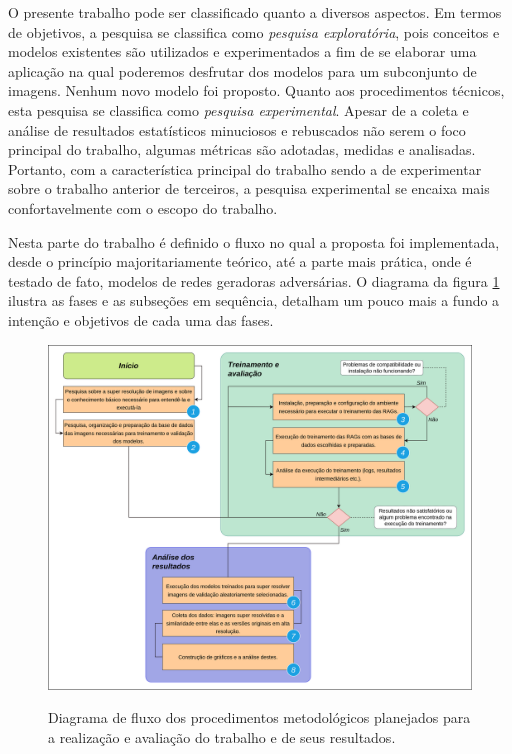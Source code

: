 \label{procedimentos}

O presente trabalho pode ser classificado quanto a diversos aspectos. Em termos de objetivos, a pesquisa se classifica como \textit{pesquisa exploratória}, pois conceitos e modelos existentes são utilizados e experimentados a fim de se elaborar uma aplicação na qual poderemos desfrutar dos modelos para um subconjunto de imagens. Nenhum novo modelo foi proposto. Quanto aos procedimentos técnicos, esta pesquisa se classifica como \textit{pesquisa experimental}. Apesar de a coleta e análise de resultados estatísticos minuciosos e rebuscados não serem o foco principal do trabalho, algumas métricas são adotadas, medidas e analisadas. Portanto, com a característica principal do trabalho sendo a de experimentar sobre o trabalho anterior de terceiros, a pesquisa experimental se encaixa mais confortavelmente com o escopo do trabalho.

Nesta parte do trabalho é definido o fluxo no qual a proposta foi implementada, desde o princípio majoritariamente teórico, até a parte mais prática, onde é testado de fato, modelos de redes geradoras adversárias. O diagrama da figura \ref{fig:fig9} ilustra as fases e as subseções em sequência, detalham um pouco mais a fundo a intenção e objetivos de cada uma das fases.

\begin{figure}[H]
    \centering
    \caption{Diagrama de fluxo dos procedimentos metodológicos planejados para a realização e avaliação do trabalho e de seus resultados.}
    \includegraphics[width=14cm]{fig/flow_diagram_development.png}
    \label{fig:fig9}
\end{figure}


